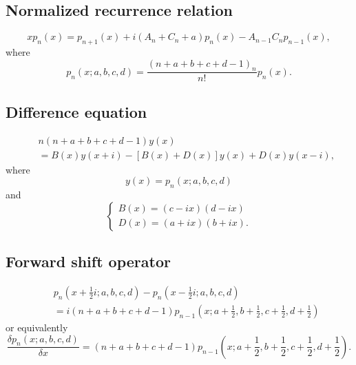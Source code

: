 \documentclass[envcountchap,graybox]{svmono}
\begin{document}
\subsection*{Normalized recurrence relation}
\begin{equation}
\label{NormRecContHahn}
xp_n(x)=p_{n+1}(x)+i(A_n+C_n+a)p_n(x)-A_{n-1}C_np_{n-1}(x),
\end{equation}
where
$$p_n(x;a,b,c,d)=\frac{(n+a+b+c+d-1)_n}{n!}p_n(x).$$

\subsection*{Difference equation}
\begin{eqnarray}
\label{dvContHahn}
& &n(n+a+b+c+d-1)y(x)\nonumber\\
& &{}=B(x)y(x+i)-\left[B(x)+D(x)\right]y(x)+D(x)y(x-i),
\end{eqnarray}
where
$$y(x)=p_n(x;a,b,c,d)$$
and
$$\left\{\begin{array}{l}
\displaystyle B(x)=(c-ix)(d-ix)\\[5mm]
\displaystyle D(x)=(a+ix)(b+ix).
\end{array}\right.$$

\subsection*{Forward shift operator}
\begin{eqnarray}
\label{shift1ContHahnI}
& &p_n(x+\textstyle\frac{1}{2}i;a,b,c,d)-p_n(x-\textstyle\frac{1}{2}i;a,b,c,d)\nonumber\\
& &{}=i(n+a+b+c+d-1)p_{n-1}(x;a+\textstyle\frac{1}{2},
b+\textstyle\frac{1}{2},c+\textstyle\frac{1}{2},d+\textstyle\frac{1}{2})
\end{eqnarray}
or equivalently
\begin{equation}
\label{shift1ContHahnII}
\frac{\delta p_n(x;a,b,c,d)}{\delta x}=(n+a+b+c+d-1)
p_{n-1}(x;a+\textstyle\frac{1}{2},b+\textstyle\frac{1}{2},
c+\textstyle\frac{1}{2},d+\textstyle\frac{1}{2}).
\end{equation}
\end{document}
